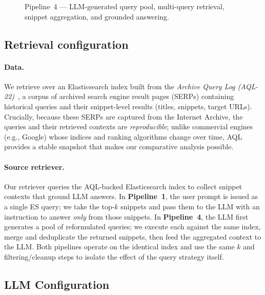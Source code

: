 \documentclass[manuscript,screen]{acmart}
\begin{document}
\begin{CCSXML}
\begin{figure}[H]
{%
		}
		\caption{Pipeline~4 — LLM-generated query pool, multi-query retrieval, snippet aggregation, and grounded answering.}
		\label{fig:pipeline4}
	\end{figure}



	\subsection{Retrieval configuration}
	\label{subsec:retrieval-config}
	
	\paragraph{Data.}
	We retrieve over an Elasticsearch index built from the \emph{Archive Query Log (AQL-22)}~\citep{reimer:2023}, a corpus of archived search engine result pages (SERPs) containing historical queries and their snippet-level results (titles, snippets, target URLs). Crucially, because these SERPs are captured from the Internet Archive, the queries and their retrieved contexts are \emph{reproducible}; unlike commercial engines (e.g., Google) whose indices and ranking algorithms change over time, AQL provides a stable snapshot that makes our comparative analysis possible.
	
	\paragraph{Source retriever.}
	Our retriever queries the AQL-backed Elasticsearch index to collect snippet contexts that ground LLM answers. In \textbf{Pipeline~1}, the user prompt is issued as a single ES query; we take the top-$k$ snippets and pass them to the LLM with an instruction to answer \emph{only} from those snippets. In \textbf{Pipeline~4}, the LLM first generates a pool of reformulated queries; we execute each against the same index, merge and deduplicate the returned snippets, then feed the aggregated context to the LLM. Both pipelines operate on the identical index and use the same $k$ and filtering/cleanup steps to isolate the effect of the query strategy itself.
	
	\subsection{LLM Configuration}
	\label{subsec:llm-config}
	

\end{CCSXML}
\end{document}
